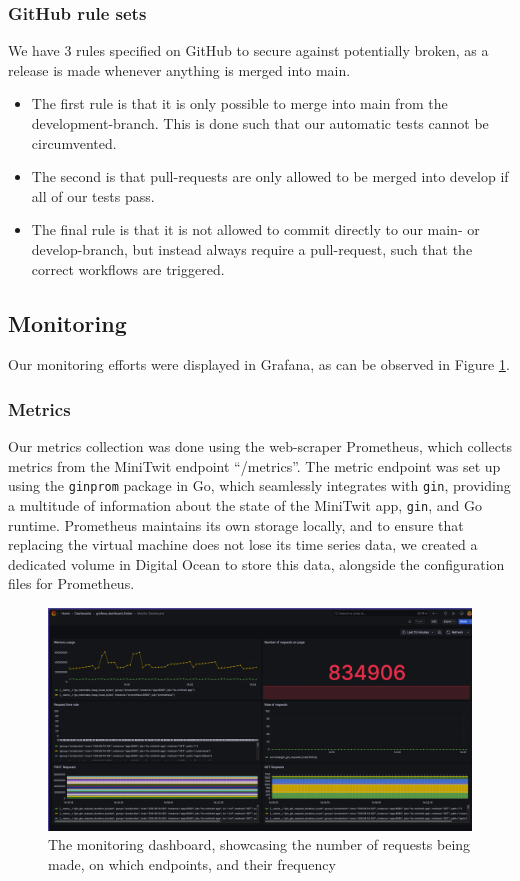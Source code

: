 \subsubsection*{GitHub rule sets}
We have 3 rules specified on GitHub to secure against potentially broken, as a release is made whenever anything is merged into main. 

\begin{itemize}
    \item The first rule is that it is only possible to merge into main from the development-branch. This is done such that our automatic tests cannot be circumvented.
    \item The second is that pull-requests are only allowed to be merged into develop if all of our tests pass.
    \item The final rule is that it is not allowed to commit directly to our main- or develop-branch, but instead always require a pull-request, such that the correct workflows are triggered.
\end{itemize}
\subsection{Monitoring}
 Our monitoring efforts were displayed in Grafana, as can be observed in Figure \ref{fig:monitor}.
\subsubsection{Metrics}
Our metrics collection was done using the web-scraper Prometheus, which collects metrics from the MiniTwit endpoint “/metrics”. The metric endpoint was set up using the \texttt{ginprom} package in Go, which seamlessly integrates with \texttt{gin}, providing a multitude of information about the state of the MiniTwit app, \texttt{gin}, and Go runtime. Prometheus maintains its own storage locally, and to ensure that replacing the virtual machine does not lose its time series data, we created a dedicated volume in Digital Ocean to store this data, alongside the configuration files for Prometheus. 

\begin{figure} [H]
    \centering
    \includegraphics[width=1\linewidth]{images/Monitor.png}
    \caption{The monitoring dashboard, showcasing the number of requests being made, on which endpoints, and their frequency}
    \label{fig:monitor}
\end{figure}

